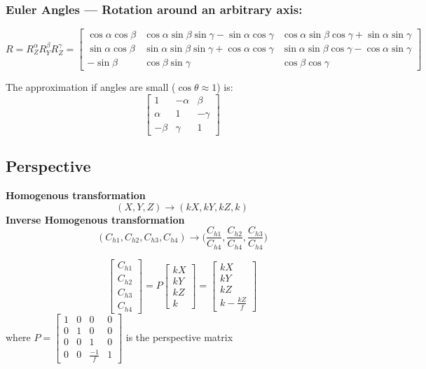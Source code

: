 \documentclass{article}
\begin{document}
\subsubsection*{Euler Angles --- Rotation around an arbitrary axis:}
\[R=R_Z^\alpha R_Y^\beta R_Z^\gamma=\begin{bmatrix}
    \cos\alpha\cos\beta & \cos\alpha\sin\beta\sin\gamma - \sin\alpha\cos\gamma &
    \cos\alpha\sin\beta\cos\gamma + \sin\alpha\sin\gamma \\
    \sin\alpha\cos\beta & \sin\alpha\sin\beta\sin\gamma + \cos\alpha\cos\gamma &
    \sin\alpha\sin\beta\cos\gamma - \cos\alpha\sin\gamma \\
    -\sin\beta & \cos\beta\sin\gamma & \cos\beta\cos\gamma
\end{bmatrix}\]

The approximation if angles are small ($\cos\theta \approx 1$) is:
\[\begin{bmatrix}
    1 & -\alpha & \beta \\
    \alpha & 1 & -\gamma \\
    -\beta & \gamma & 1
\end{bmatrix}\]

\subsection*{Perspective}
\textbf{Homogenous transformation}
\[(X, Y, Z) \rightarrow (kX, kY, kZ, k)\]
\textbf{Inverse Homogenous transformation}
\[(C_{h1}, C_{h2}, C_{h3}, C_{h4}) \rightarrow \Big(\frac{C_{h1}}{C_{h4}}, \frac{C_{h2}}{C_{h4}},
\frac{C_{h3}}{C_{h4}}\Big)\]

\[\begin{bmatrix}
    C_{h1} \\ C_{h2} \\ C_{h3} \\ C_{h4}
\end{bmatrix} = P \begin{bmatrix}
    kX \\ kY \\ kZ \\ k
\end{bmatrix}=\begin{bmatrix}
    kX \\ kY \\ kZ \\ k - \frac{kZ}{f}
\end{bmatrix}\] where $P=\begin{bmatrix}
    1 & 0 & 0 & 0 \\
    0 & 1 & 0 & 0 \\
    0 & 0 & 1 & 0 \\
    0 & 0 & \frac{-1}{f} & 1
\end{bmatrix}$ is the perspective matrix
\end{document}
